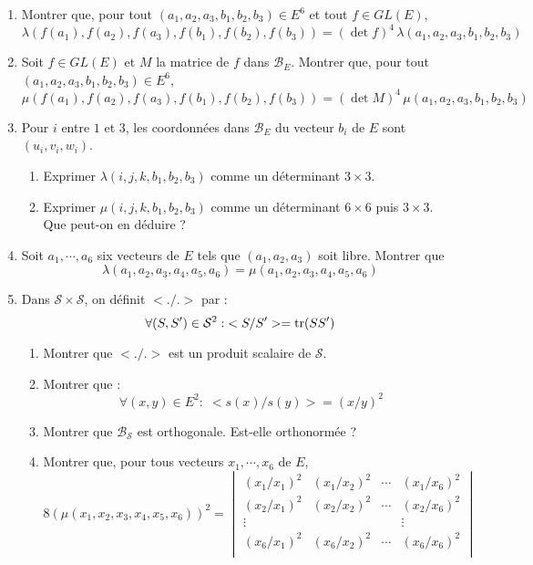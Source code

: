 \begin{enumerate}
 \item Montrer que, pour tout $(a_1,a_2,a_3,b_1,b_2,b_3) \in E^6$ et tout $f\in GL(E)$, 
\begin{displaymath}
\lambda \left( f(a_1),f(a_2),f(a_3),f(b_1),f(b_2),f(b_3) \right)=
(\det f)^4 \,\lambda \left(a_1,a_2,a_3,b_1,b_2,b_3 \right)
\end{displaymath}
\item Soit $f\in GL(E)$ et $M$ la matrice de $f$ dans $\mathcal B_E$.\newline
Montrer que, pour tout $(a_1,a_2,a_3,b_1,b_2,b_3) \in E^6$, 
\begin{displaymath}
\mu \left( f(a_1),f(a_2),f(a_3),f(b_1),f(b_2),f(b_3) \right)=
(\det M)^4 \,\mu \left(a_1,a_2,a_3,b_1,b_2,b_3 \right)
\end{displaymath}
\item Pour $i$ entre $1$ et $3$, les coordonnées dans $\mathcal B_E$ du vecteur $b_i$ de $E$ sont $(u_i,v_i,w_i)$.
\begin{enumerate}
 \item Exprimer $\lambda(i,j,k,b_1,b_2,b_3)$ comme un déterminant $3\times3$.
\item Exprimer $\mu(i,j,k,b_1,b_2,b_3)$ comme un déterminant $6\times6$ puis $3\times3$. Que peut-on en déduire ?
\end{enumerate}
\item Soit $a_1,\cdots, a_6$ six vecteurs de $E$ tels que $(a_1,a_2,a_3)$ soit libre. Montrer que 
\begin{displaymath}
 \lambda(a_1,a_2,a_3,a_4,a_5,a_6)=\mu (a_1,a_2,a_3,a_4,a_5,a_6)
\end{displaymath}
\item Dans $\mathcal S \times \mathcal S$, on définit $<./.>$ par :
\begin{displaymath}
 \forall(S,S') \in \mathcal S^2 : \;<S/S'> = \operatorname{tr} (SS')
\end{displaymath}
\begin{enumerate}
 \item Montrer que $<./.>$ est un produit scalaire de $\mathcal S$.
\item Montrer que :
\begin{displaymath}
 \forall(x,y) \in E^2 :  \;<s(x)/s(y)> = (x/y)^2 
\end{displaymath}
\item Montrer que $\mathcal B_\mathcal S$ est orthogonale. Est-elle orthonormée ?
\item Montrer que, pour tous vecteurs $x_1,\cdots,x_6$ de $E$,
\begin{displaymath}
 8\left( \mu(x_1,x_2,x_3,x_4,x_5,x_6)\right)^2
=
\begin{vmatrix}
 (x_1/x_1)^2 & (x_1/x_2)^2 & \cdots & (x_1/x_6)^2\\
(x_2/x_1)^2 & (x_2/x_2)^2 & \cdots & (x_2/x_6)^2\\ 
\vdots &                  &        &   \vdots    \\
(x_6/x_1)^2 & (x_6/x_2)^2 & \cdots & (x_6/x_6)^2\\
\end{vmatrix} 
\end{displaymath}


\end{enumerate}
\end{enumerate}
